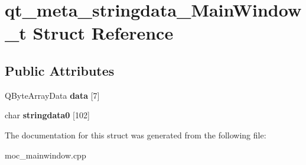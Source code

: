 \hypertarget{structqt__meta__stringdata__MainWindow__t}{}\section{qt\+\_\+meta\+\_\+stringdata\+\_\+\+Main\+Window\+\_\+t Struct Reference}
\label{structqt__meta__stringdata__MainWindow__t}
\subsection*{Public Attributes}
\begin{DoxyCompactItemize}
\item 
\mbox{\label{structqt__meta__stringdata__MainWindow__t_a70e55b3cae36e81c3bf1093c26a52b51}} 
Q\+Byte\+Array\+Data {\bfseries data} \mbox{[}7\mbox{]}
\item 
\mbox{\label{structqt__meta__stringdata__MainWindow__t_ad064cd34bea4b051176f94284d4411da}} 
char {\bfseries stringdata0} \mbox{[}102\mbox{]}
\end{DoxyCompactItemize}


The documentation for this struct was generated from the following file\+:\begin{DoxyCompactItemize}
\item 
moc\+\_\+mainwindow.\+cpp\end{DoxyCompactItemize}
